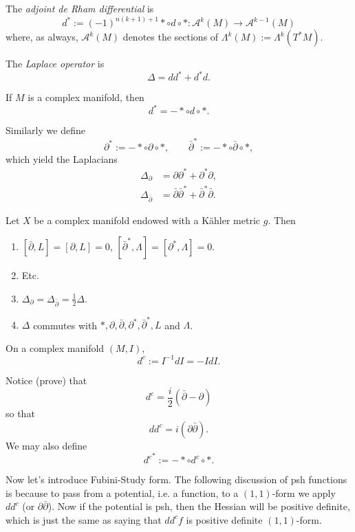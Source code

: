 \documentclass{book}
\begin{document}
\begin{definition}
\label{definition-adjoi-de-rham-diffe}
The {\it adjoint de Rham differential} is
$$
d^*:=(-1)^{n(k+1)+1}*\circ d\circ *
:\mathcal{A}^k(M) \to \mathcal{A}^{k-1}(M)
$$
where, as always, $\mathcal{A}^k(M)$ denotes
the
sections of $\Lambda^k(M):=\Lambda^k(T^*M)$.
\end{definition}

\begin{definition}
\label{definition-laplace}
The {\it Laplace operator} is
$$
\Delta=d d^*+d^*d.
$$
\end{definition}

\noindent
If $M$ is a complex manifold,
then
$$
d^*=-*\circ d \circ *.
$$

Similarly we define
$$
\partial^*:=-* \circ \partial \circ *,
\qquad
\bar\partial^*:=-* \circ \bar\partial \circ
*,
$$
which yield the Laplacians
$$
\begin{aligned}
\Delta_\partial&=\partial \partial^*
+\partial^*\partial,\\
\Delta_{\bar\partial}&=\bar\partial
\bar\partial^*+\bar\partial^*\bar\partial.
\end{aligned}
$$

\begin{proposition}
\label{proposition-kahler-identities}
Let $X$ be a complex manifold endowed with a
Kähler metric $g$. Then
\begin{enumerate}
\item $[\bar\partial,L]=[\partial,L]=0$,
$[\bar\partial^*,\Lambda]=[\partial^*,
\Lambda]=0$.
\item  Etc.
\item
$\Delta_\partial=\Delta_{\bar\partial}=
\frac{1}{2}\Delta$.
\item $\Delta$ commutes with
$*,\partial,\bar\partial,\partial^*,
\bar\partial^*,L$
and $\Lambda$.
\end{enumerate}
\end{proposition}

\begin{definition}
\label{definition-dc}
On a complex manifold $(M,I)$,
$$
d^c:=I^{-1}d I=-I d I.
$$
\end{definition}

Notice (prove) that
$$
d^c=\frac{i}{2}(\bar\partial-\partial)
$$
so that
$$
dd^c=i(\partial \bar\partial).
$$
We may also define
$$
{d^c}^*:=-* \circ d^c \circ *.
$$




\noindent
Now let's introduce Fubini-Study form.
The following discussion of psh functions is
because
to pass from a potential, i.e. a function,
to a $(1,1)$-form we apply $dd^c$ (or
$\partial\bar\partial$).
Now if the potential is psh,
then the Hessian will be positive definite,
which is just the same as saying that
$dd^cf$ is positive definite $(1,1)$-form.
\end{document}
